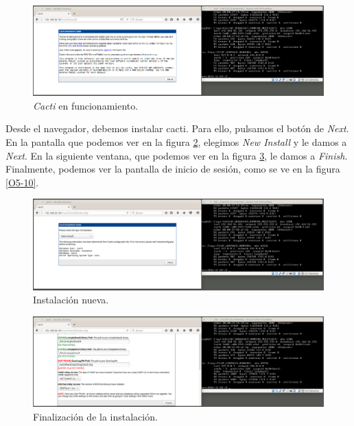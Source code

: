 \documentclass[a4paper,titlepage,12pt]{scrartcl}	%
\numberwithin{figure}{section} %
\numberwithin{table}{section} %
\begin{document}
	\begin{figure}[H]
		\includegraphics[width=\linewidth]{./Imagenes/O5-7.png}
		\vspace{-0.5cm}
		\caption[\textit{Cacti} en funcionamiento.]{\textit{Cacti} en funcionamiento.}
		\label{O5-7}
	\end{figure}
	
	Desde el navegador, debemos instalar cacti. Para ello, pulsamos el botón de \textit{Next}. En la pantalla que podemos ver en la figura \ref{O5-8}, elegimos \textit{New Install} y le damos a \textit{Next}. En la siguiente ventana, que podemos ver en la figura \ref{O5-9}, le damos a \textit{Finish}. Finalmente, podemos ver la pantalla de inicio de sesión, como se ve en la figura \ref{O5-10}.
	
	\begin{figure}[H]
		\includegraphics[width=\linewidth]{./Imagenes/O5-8.png}
		\vspace{-0.5cm}
		\caption[Instalación nueva.]{Instalación nueva.}
		\label{O5-8}
	\end{figure}
	
	\begin{figure}[H]
		\includegraphics[width=\linewidth]{./Imagenes/O5-9.png}
		\vspace{-0.5cm}
		\caption[Finalización de la instalación.]{Finalización de la instalación.}
		\label{O5-9}
	\end{figure}
	
\end{document}
